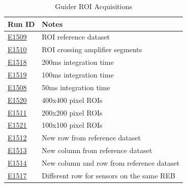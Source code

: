 \begin{table}[ht]\label{table:runs_guider}
\centering
\caption{Guider ROI Acquisitions}
\begin{tabular}{|p{1.5cm}|p{9cm}|}
\hline
Run ID & Notes \\ \hline
\href{https://s3df.slac.stanford.edu/data/rubin/lsstcam/E1509/w_2024_35/}{E1509} & ROI reference dataset\\ \hline
\href{https://s3df.slac.stanford.edu/data/rubin/lsstcam/E1510/w_2024_35/}{E1510} & ROI crossing amplifier segments\\ \hline
\href{https://s3df.slac.stanford.edu/data/rubin/lsstcam/E1518/w_2024_35/}{E1518} & 200ms integration time\\ \hline
\href{https://s3df.slac.stanford.edu/data/rubin/lsstcam/E1519/w_2024_35/}{E1519} & 100ms integration time\\ \hline
\href{https://s3df.slac.stanford.edu/data/rubin/lsstcam/E1508/w_2024_35/}{E1508} & 50ms integration time\\ \hline
\href{https://s3df.slac.stanford.edu/data/rubin/lsstcam/E1520/w_2024_35/}{E1520} & 400x400 pixel ROIs\\ \hline
\href{https://s3df.slac.stanford.edu/data/rubin/lsstcam/E1511/w_2024_35/}{E1511} & 200x200 pixel ROIs\\ \hline
\href{https://s3df.slac.stanford.edu/data/rubin/lsstcam/E1521/w_2024_35/}{E1521} & 100x100 pixel ROIs\\ \hline
\href{https://s3df.slac.stanford.edu/data/rubin/lsstcam/E1512/w_2024_35/}{E1512} & New row from reference dataset\\ \hline
\href{https://s3df.slac.stanford.edu/data/rubin/lsstcam/E1513/w_2024_35/}{E1513} & New column from reference dataset\\ \hline
\href{https://s3df.slac.stanford.edu/data/rubin/lsstcam/E1514/w_2024_35/}{E1514} & New column and row from reference dataset\\ \hline
\href{https://s3df.slac.stanford.edu/data/rubin/lsstcam/E1517/w_2024_35/}{E1517} & Different row for sensors on the same REB\\ \hline
\end{tabular}
\end{table}


\clearpage